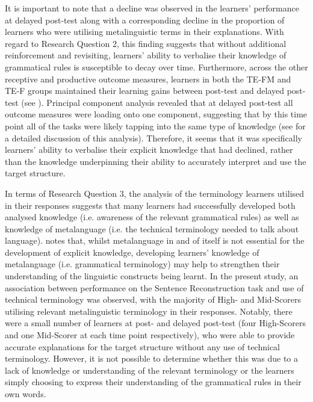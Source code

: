 \documentclass[output=paper]{langscibook}
\begin{document}
It is important to note that a decline was observed in the learners’ performance at delayed post-test along with a corresponding decline in the proportion of learners who were utilising metalinguistic terms in their explanations. With regard to Research Question 2, this finding suggests that without additional reinforcement and revisiting, learners’ ability to verbalise their knowledge of grammatical rules is susceptible to decay over time. Furthermore, across the other receptive and productive outcome measures, learners in both the TE-FM and TE-F groups maintained their learning gains between post-test and delayed post-test (see \citealt{Hanan2015,KasprowiczMarsden2018}). Principal component analysis revealed that at delayed post-test all outcome measures were loading onto one component, suggesting that by this time point all of the tasks were likely tapping into the same type of knowledge (see \citealt{Hanan2015} for a detailed discussion of this analysis). Therefore, it seems that it was specifically learners’ ability to verbalise their explicit knowledge that had declined, rather than the knowledge underpinning their ability to accurately interpret and use the target structure.

\begin{sloppypar}
In terms of Research Question 3, the analysis of the terminology learners utilised in their responses suggests that many learners had successfully developed both analysed knowledge (i.e. awareness of the relevant grammatical rules) as well as knowledge of metalanguage (i.e. the technical terminology needed to talk about language). \citet{Ellis2004} notes that, whilst metalanguage in and of itself is not essential for the development of explicit knowledge, developing learners’ knowledge of metalanguage (i.e. grammatical terminology) may help to strengthen their understanding of the linguistic constructs being learnt. In the present study, an association between performance on the Sentence Reconstruction task and use of technical terminology was observed, with the majority of High- and Mid-Scorers utilising relevant metalinguistic terminology in their responses. Notably, there were a small number of learners at post- and delayed post-test (four High-Scorers and one Mid-Scorer at each time point respectively), who were able to provide accurate explanations for the target structure without any use of technical terminology. However, it is not possible to determine whether this was due to a lack of knowledge or understanding of the relevant terminology or the learners simply choosing to express their understanding of the grammatical rules in their own words. 
\end{sloppypar}
\end{document}
